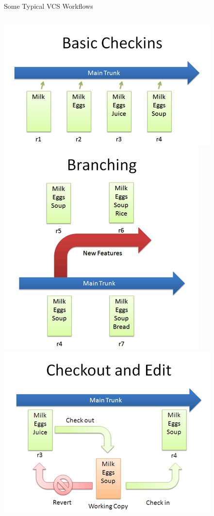\documentclass[10pt,xcolor=dvipsnames]{beamer}
\begin{document}
\begin{frame}{Some Typical VCS Workflows}
\begin{columns}
{\includegraphics [scale=0.3]{basic_checkin.png}}
\pause
{\includegraphics [scale=0.3]{first_branch.png}}
\pause
{}
{\includegraphics [scale=0.3]{checkout_edit.png}}

\end{columns}
\end{frame}
\end{document}
